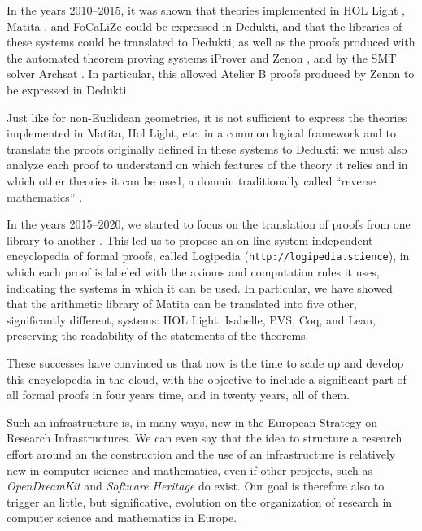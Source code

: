 In the years 2010--2015, it was shown that theories implemented in
{\sc HOL Light} \cite{Assaf12}, {\sc Matita} \cite{Assaf15}, and {\sc
  FoCaLiZe} \cite{Cauderlier16} could be expressed in {\sc Dedukti},
and that the libraries of these systems could be translated to {\sc
  Dedukti}, as well as the proofs produced with the automated theorem
proving systems {\sc iProver} \cite{Burel10} and {\sc Zenon}
\cite{CauderlierHalmagrand15}, and by the SMT solver {\sc Archsat}
\cite{Bury19}. In particular, this allowed {\sc Atelier B} proofs
produced by {\sc Zenon} to be expressed in {\sc Dedukti}.

Just like for non-Euclidean geometries, it is not sufficient to
express the theories implemented in {\sc Matita}, {\sc Hol Light},
etc.  in a common logical framework and to translate the proofs
originally defined in these systems to {\sc Dedukti}: we must also
analyze each proof to understand on which features of the theory it
relies and in which other theories it can be used, a domain
traditionally called ``reverse mathematics''
\cite{Friedman76,Simpson09,Dowek17}.

In the years 2015--2020, we started to focus on the translation of
proofs from one library to another \cite{Dowek17,Thire18}. This led us
to propose an on-line system-independent encyclopedia of formal
proofs, called {\sc Logipedia} ({\tt http://logipedia.science}), in
which each proof is labeled with the axioms and computation rules it
uses, indicating the systems in which it can be used. In particular,
we have showed that the arithmetic library of {\sc Matita} can be
translated into five other, significantly different, systems: {\sc HOL
  Light}, {\sc Isabelle}, {\sc PVS}, {\sc Coq}, and {\sc Lean},
preserving the readability of the statements of the theorems.

These successes have convinced us that now is the time to scale up and
develop this encyclopedia in the cloud, with the objective to include
a significant part of all formal proofs in four years time, and in
twenty years, all of them.

Such an infrastructure is, in many ways, new in the European Strategy
on Research Infrastructures. We can even say that the idea to
structure a research effort around an the construction and the use of
an infrastructure is relatively new in computer science and
mathematics, even if other projects, such as {\em OpenDreamKit} and
{\em Software Heritage} do exist. Our goal is therefore also to
trigger an little, but significative, evolution on the organization of
research in computer science and mathematics in Europe.


